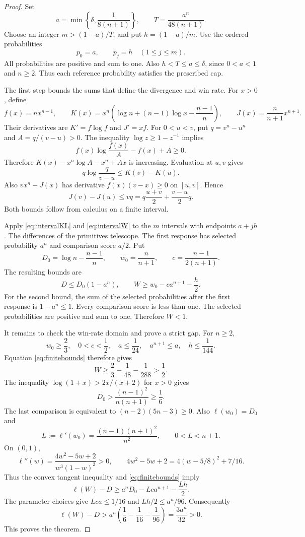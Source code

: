 \documentclass[11pt,a4paper]{article}
\begin{document}
\begin{proof}
Set
\[
 a=\min\left\{\delta,\frac1{8(n+1)}\right\},\qquad
 T=\frac{a^n}{48(n+1)}.
\]
Choose an integer $m>(1-a)/T$, and put $h=(1-a)/m$. Use the ordered probabilities
\[
 p_0=a,\qquad p_j=h\quad(1\leq j\leq m).
\]
All probabilities are positive and sum to one. Also $h<T\leq a\leq\delta$, since $0<a<1$ and $n\geq2$. Thus each reference probability satisfies the prescribed cap.

The first step bounds the sums that define the divergence and win rate. For $x>0$, define
\[
 f(x)=nx^{n-1},\qquad
 K(x)=x^n\left(\log n+(n-1)\log x-\frac{n-1}{n}\right),
 \qquad J(x)=\frac{n}{n+1}x^{n+1}.
\]
Their derivatives are $K'=f\log f$ and $J'=xf$.
For $0<u<v$, put $q=v^n-u^n$ and $A=q/(v-u)>0$.
The inequality $\log z\geq1-z^{-1}$ implies
\[
 f(x)\log\frac{f(x)}A-f(x)+A\geq0.
\]
Therefore $K(x)-x^n\log A-x^n+Ax$ is increasing. Evaluation at $u,v$ gives
\begin{equation}\label{eq:intervalKL}
 q\log\frac q{v-u}\leq K(v)-K(u).
\end{equation}
Also $vx^n-J(x)$ has derivative $f(x)(v-x)\geq0$ on $[u,v]$. Hence
\begin{equation}\label{eq:intervalW}
 J(v)-J(u)\leq vq
 =q\frac{u+v}{2}+\frac{v-u}{2}q.
\end{equation}
Both bounds follow from calculus on a finite interval.

Apply \eqref{eq:intervalKL} and \eqref{eq:intervalW} to the $m$ intervals with endpoints $a+jh$. The differences of the primitives telescope. The first response has selected probability $a^n$ and comparison score $a/2$. Put
\[
 D_0=\log n-\frac{n-1}{n},\qquad w_0=\frac{n}{n+1},
 \qquad c=\frac{n-1}{2(n+1)}.
\]
The resulting bounds are
\begin{equation}\label{eq:finitebounds}
 D\leq D_0(1-a^n),\qquad
 W\geq w_0-ca^{n+1}-\frac h2.
\end{equation}
For the second bound, the sum of the selected probabilities after the first response is $1-a^n\leq1$.
Every comparison score is less than one. The selected probabilities are positive and sum to one. Therefore $W<1$.

It remains to check the win-rate domain and prove a strict gap. For $n\geq2$,
\[
 w_0\geq\frac23,\quad 0<c<\frac12,\quad
 a\leq\frac1{24},\quad a^{n+1}\leq a,\quad h\leq\frac1{144}.
\]
Equation \eqref{eq:finitebounds} therefore gives
\[
 W\geq\frac23-\frac1{48}-\frac1{288}>\frac12.
\]
The inequality $\log(1+x)>2x/(x+2)$ for $x>0$ gives
\[
 D_0>\frac{(n-1)^2}{n(n+1)}\geq\frac16.
\]
The last comparison is equivalent to $(n-2)(5n-3)\geq0$.
Also $\ell(w_0)=D_0$ and
\[
 L:=\ell'(w_0)=\frac{(n-1)(n+1)^2}{n^2},\qquad 0<L<n+1.
\]
On $(0,1)$,
\[
 \ell''(w)=\frac{4w^2-5w+2}{w^3(1-w)^2}>0,
 \qquad 4w^2-5w+2=4(w-5/8)^2+7/16.
\]
Thus the convex tangent inequality and \eqref{eq:finitebounds} imply
\[
 \ell(W)-D\geq a^nD_0-Lca^{n+1}-\frac{Lh}{2}.
\]
The parameter choices give $Lca\leq1/16$ and $Lh/2\leq a^n/96$. Consequently
\[
 \ell(W)-D>a^n\left(\frac16-\frac1{16}-\frac1{96}\right)
 =\frac{3a^n}{32}>0.
\]
This proves the theorem.
\end{proof}
\end{document}
